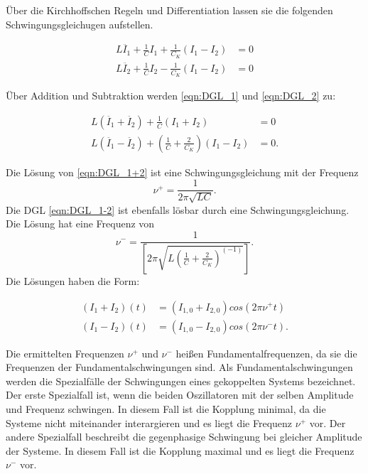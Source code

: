 Über die Kirchhoffschen Regeln und Differentiation lassen sie die folgenden
Schwingungsgleichugen aufstellen.

\begin{align}
  \label{eqn:DGL_1}
  L\ddot{I_1} + \frac{1}{C}I_1+\frac{1}{C_K}\left(I_1 - I_2 \right) &= 0\\
  \label{eqn:DGL_2}
  L\ddot{I_2} + \frac{1}{C}I_2-\frac{1}{C_K}\left(I_1 - I_2 \right) &= 0
\end{align}

Über Addition und Subtraktion werden \eqref{eqn:DGL_1} und \eqref{eqn:DGL_2}
zu:

\begin{align}
  \label{eqn:DGL_1+2}
  L\left(\ddot{I_1} + \ddot{I_2}\right) + \frac{1}{C}\left(I_1 + I_2\right)&=0\\
  \label{eqn:DGL_1-2}
  L\left(\ddot{I_1} - \ddot{I_2}\right) + \left(\frac{1}{C} + \frac{2}{C_K}\right)\left(I_1 - I_2\right)&=0.
\end{align}

Die Lösung von \eqref{eqn:DGL_1+2} ist eine Schwingungsgleichung mit der Frequenz
\begin{equation}
  \nu^+ = \frac{1}{2\pi\sqrt{LC}}.
\end{equation}
Die DGL \eqref{eqn:DGL_1-2} ist ebenfalls
lösbar durch eine Schwingungsgleichung. Die Lösung hat eine Frequenz von
\begin{equation}
  \nu^- = \frac{1}{\left[2\pi\sqrt{L\left(\frac{1}{C}+\frac{2}{C_K}\right)^{(-1)}}\right]}.
\end{equation}
Die Lösungen haben die Form:

\begin{align}
  \left(I_1 + I_2\right)(t) &= \left(I_{1,0} + I_{2,0}\right)cos\left(2\pi\nu^+t\right)\\
  \left(I_1 - I_2\right)(t) &= \left(I_{1,0} - I_{2,0}\right)cos\left(2\pi\nu^-t\right).
\end{align}

Die ermittelten Frequenzen $\nu^+$ und $\nu^-$ heißen Fundamentalfrequenzen,
da sie die Frequenzen der Fundamentalschwingungen sind. Als Fundamentalschwingungen
werden die Spezialfälle der Schwingungen eines gekoppelten Systems bezeichnet.
Der erste Spezialfall ist, wenn die beiden Oszillatoren mit der selben
Amplitude und Frequenz schwingen.
In diesem Fall ist die Kopplung minimal, da die Systeme nicht miteinander interargieren
und es liegt die Frequenz $\nu^+$ vor. Der andere Spezialfall beschreibt die
gegenphasige Schwingung bei gleicher Amplitude der Systeme. In diesem Fall
ist die Kopplung maximal und es liegt die Frequenz $\nu^-$ vor.

